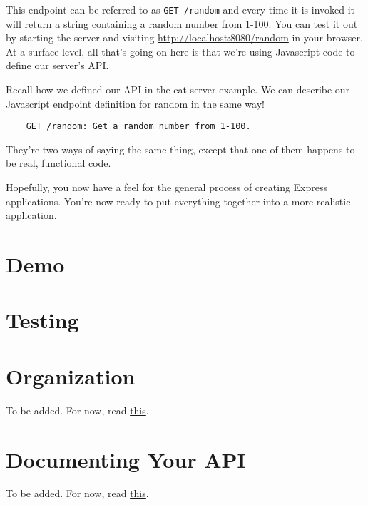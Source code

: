 This endpoint can be referred to as \texttt{GET /random} and every time it is invoked it will return a string containing a random number from 1-100. You can test it out by starting the server and visiting \url{http://localhost:8080/random} in your browser. At a surface level, all that's going on here is that we're using Javascript code to define our server's API. 

\begin{kaobox}[title=Describing the API with English]
    Recall how we defined our API in the cat server example. We can describe our Javascript endpoint definition for random in the same way! 

    \begin{verbatim}
    GET /random: Get a random number from 1-100.
    \end{verbatim}
    
    They're two ways of saying the same thing, except that one of them happens to be real, functional code.
\end{kaobox}

Hopefully, you now have a feel for the general process of creating Express applications. You're now ready to put everything together into a more realistic application.

\section{Demo}

\section{Testing}

\section{Organization}
To be added. For now, read \href{https://blog.logrocket.com/organizing-express-js-project-structure-better-productivity}{this}.
\section{Documenting Your API}
To be added. For now, read \href{https://swagger.io/solutions/api-documentation/}{this}.

